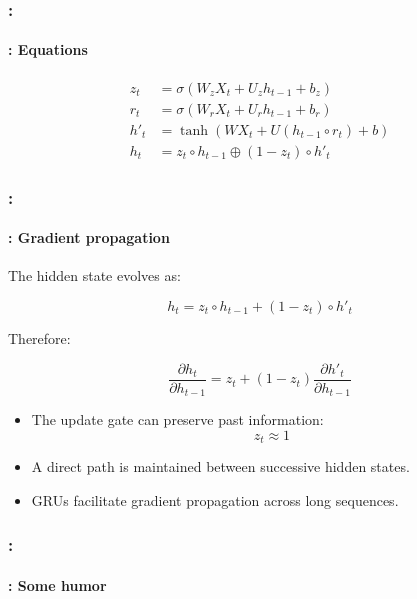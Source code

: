 \documentclass[xcolor=table]{beamer}
\begin{document}
\begin{frame}
	\frametitle{\insertshortsubtitle: \insertsection}
	\framesubtitle{\insertsubsection: Equations}
	
	{\huge\vskip-24pt
		\begin{align*}
			z_t &= \sigma(W_z X_t + U_z h_{t-1} + b_z) \\
			r_t &= \sigma(W_r X_t + U_r h_{t-1} + b_r) \\
			h'_t &= \tanh(W X_t + U (h_{t-1} \circ r_t) + b) \\
			h_t &= z_t \circ h_{t-1} \oplus (1-z_t) \circ h'_t
		\end{align*}
	}
	
\end{frame}

\begin{frame}
	\frametitle{\insertshortsubtitle: \insertsection}
	\framesubtitle{\insertsubsection: Gradient propagation}
	
	The hidden state evolves as:
	
	\[
	h_t = z_t \circ h_{t-1} + (1-z_t) \circ h'_t
	\]
	
	\vspace{0.3cm}
	
	Therefore:
	
	\[
	\frac{\partial h_t}{\partial h_{t-1}}
	=
	z_t
	+
	(1-z_t)
	\frac{\partial h'_t}{\partial h_{t-1}}
	\]
	
	\vspace{0.3cm}
	
	\begin{itemize}
		\item The update gate can preserve past information:
		\[
		z_t \approx 1
		\]
		
		\item A direct path is maintained between successive hidden states.
		
		\item GRUs facilitate gradient propagation across long sequences.
	\end{itemize}
	
\end{frame}

\begin{frame}
	\frametitle{\insertshortsubtitle: \insertsection}
	\framesubtitle{\insertsubsection: Some humor}
	
	\begin{center}
	\end{center}
	
\end{frame}
\end{document}
